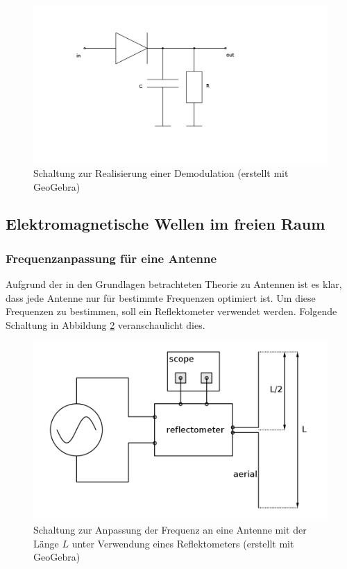 	\begin{figure}[H]
		\center
		\includegraphics[scale = 0.5]{schaltung-demodulation-01.png}
		\caption{\centering Schaltung zur Realisierung einer Demodulation \cite{unterlagen} (erstellt mit GeoGebra)}
		\label{schaltung_demodulation_1}
	\end{figure}


\subsection{Elektromagnetische Wellen im freien Raum} %
\label{sub:elektromagnetische_wellen_im_freien_raum}

	\subsubsection{Frequenzanpassung für eine Antenne} %
	\label{ssub:frequenzanpassung_f_r_eine_antenne}
	
		Aufgrund der in den Grundlagen betrachteten Theorie zu Antennen ist es klar, dass jede Antenne nur für bestimmte Frequenzen optimiert ist.
		Um diese Frequenzen zu bestimmen, soll ein Reflektometer verwendet werden.
		Folgende Schaltung in Abbildung \ref{schaltung_reflektometer_1} veranschaulicht dies.

		\begin{figure}[H]
			\center
			\includegraphics[scale = 0.35]{schaltung-reflektometer-01.png}
			\caption{\centering Schaltung zur Anpassung der Frequenz an eine Antenne mit der Länge $L$ unter Verwendung eines Reflektometers (erstellt mit GeoGebra)}
			\label{schaltung_reflektometer_1}
		\end{figure}

